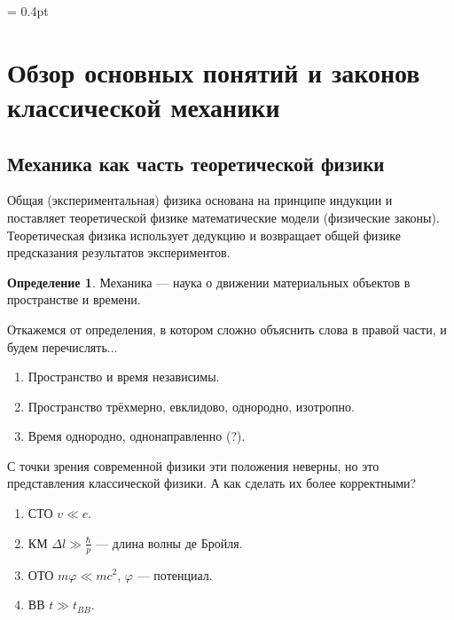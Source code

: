 \documentclass[12pt, a4paper]{article}
\begin{document}
\renewcommand{\cftsecaftersnum}{.}
\renewcommand{\cftsubsecaftersnum}{.}

\renewcommand\refname{Список литературы}

\theoremstyle{plain}
\newtheorem{thm}{Теорема}[section]
\newtheorem{lem}[thm]{Лемма}
\newtheorem{pst}{Постулат}[section]

\theoremstyle{definition}
\newtheorem{dfn}{Определение}[section]
\newtheorem{cns}[thm]{Следствие}
\newtheorem{proposition}{Предложение}[section]

\theoremstyle{remark}
\newtheorem{task}{Задача}[section]
\newtheorem{ex}{Пример}[subsection]
\newtheorem{cex}[ex]{Контрпример}
\newtheorem{rmk}{Замечание}[subsection]

\newcommand*{\eqdef}{\stackrel{\mathrm{def}}{=}}
\newcommand*{\is}[1]{\stackrel{\mathrm{\eqref{#1}}}{=}}
\newcommand*{\eqq}[1]{\stackrel{\mathrm{#1}}{=}}
\newcommand*{\hlf}{\frac{1}{2}}

\columnseprule = 0.4pt


\section{Обзор основных понятий и законов классической механики}
\subsection{Механика как часть теоретической физики}
Общая (экспериментальная) физика основана на принципе индукции и поставляет теоретической физике математические модели (физические законы). Теоретическая физика использует дедукцию и возвращает общей физике предсказания результатов экспериментов.

\begin{dfn} Механика --- наука о движении материальных объектов в пространстве и времени. \end{dfn}
Откажемся от определения, в котором сложно объяснить слова в правой части, и будем перечислять...
\begin{enumerate}
\item Пространство и время независимы.
\item Пространство трёхмерно, евклидово, однородно, изотропно.
\item Время однородно, однонаправленно (?).
\end{enumerate}
С точки зрения современной физики эти положения неверны, но это представления классической физики. А как сделать их более корректными?
\begin{enumerate}
\item СТО $v \ll c$.
\item КМ $\Delta l \gg \frac{\hbar}{p}$ --- длина волны де Бройля.
\item ОТО $m \varphi \ll mc^2$, $\varphi$ --- потенциал.
\item ВВ $t \gg t_{BB}$.
\end{enumerate}
\end{document}
